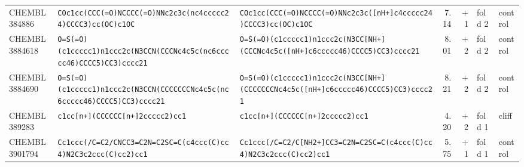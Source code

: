 \begin{longtable}{l p{4.4cm} p{4.4cm} r r l l}
CHEMBL384886 & \texttt{COc1cc(\allowbreak{}CCC(\allowbreak{}=\allowbreak{}O)\allowbreak{}NCCCC(\allowbreak{}=\allowbreak{}O)\allowbreak{}NNc2c3c(\allowbreak{}nc4ccccc24)\allowbreak{}CCCC3)\allowbreak{}cc(\allowbreak{}OC)\allowbreak{}c1OC} & \texttt{COc1cc(\allowbreak{}CCC(\allowbreak{}=\allowbreak{}O)\allowbreak{}NCCCC(\allowbreak{}=\allowbreak{}O)\allowbreak{}NNc2c3c(\allowbreak{}[nH+]\allowbreak{}c4ccccc24)\allowbreak{}CCCC3)\allowbreak{}cc(\allowbreak{}OC)\allowbreak{}c1OC} & 7.14 & +1 & fold 2 & control \\
CHEMBL3884618 & \texttt{O=\allowbreak{}S(\allowbreak{}=\allowbreak{}O)\allowbreak{}(\allowbreak{}c1ccccc1)\allowbreak{}n1ccc2c(\allowbreak{}N3CCN(\allowbreak{}CCCNc4c5c(\allowbreak{}nc6ccccc46)\allowbreak{}CCCC5)\allowbreak{}CC3)\allowbreak{}cccc21} & \texttt{O=\allowbreak{}S(\allowbreak{}=\allowbreak{}O)\allowbreak{}(\allowbreak{}c1ccccc1)\allowbreak{}n1ccc2c(\allowbreak{}N3CC[NH+]\allowbreak{}(\allowbreak{}CCCNc4c5c(\allowbreak{}[nH+]\allowbreak{}c6ccccc46)\allowbreak{}CCCC5)\allowbreak{}CC3)\allowbreak{}cccc21} & 8.01 & +2 & fold 2 & control \\
CHEMBL3884690 & \texttt{O=\allowbreak{}S(\allowbreak{}=\allowbreak{}O)\allowbreak{}(\allowbreak{}c1ccccc1)\allowbreak{}n1ccc2c(\allowbreak{}N3CCN(\allowbreak{}CCCCCCCNc4c5c(\allowbreak{}nc6ccccc46)\allowbreak{}CCCC5)\allowbreak{}CC3)\allowbreak{}cccc21} & \texttt{O=\allowbreak{}S(\allowbreak{}=\allowbreak{}O)\allowbreak{}(\allowbreak{}c1ccccc1)\allowbreak{}n1ccc2c(\allowbreak{}N3CC[NH+]\allowbreak{}(\allowbreak{}CCCCCCCNc4c5c(\allowbreak{}[nH+]\allowbreak{}c6ccccc46)\allowbreak{}CCCC5)\allowbreak{}CC3)\allowbreak{}cccc21} & 8.21 & +2 & fold 2 & control \\
CHEMBL389283 & \texttt{c1cc[n+]\allowbreak{}(\allowbreak{}CCCCCC[n+]\allowbreak{}2ccccc2)\allowbreak{}cc1} & \texttt{c1cc[n+]\allowbreak{}(\allowbreak{}CCCCCC[n+]\allowbreak{}2ccccc2)\allowbreak{}cc1} & 4.20 & +2 & fold 1 & cliff \\
CHEMBL3901794 & \texttt{Cc1ccc(\allowbreak{}/\allowbreak{}C=\allowbreak{}C2/\allowbreak{}CNCC3=\allowbreak{}C2N=\allowbreak{}C2SC=\allowbreak{}C(\allowbreak{}c4ccc(\allowbreak{}C)\allowbreak{}cc4)\allowbreak{}N2C3c2ccc(\allowbreak{}C)\allowbreak{}cc2)\allowbreak{}cc1} & \texttt{Cc1ccc(\allowbreak{}/\allowbreak{}C=\allowbreak{}C2/\allowbreak{}C[NH2+]\allowbreak{}CC3=\allowbreak{}C2N=\allowbreak{}C2SC=\allowbreak{}C(\allowbreak{}c4ccc(\allowbreak{}C)\allowbreak{}cc4)\allowbreak{}N2C3c2ccc(\allowbreak{}C)\allowbreak{}cc2)\allowbreak{}cc1} & 5.75 & +1 & fold 1 & control \\

\end{longtable}
